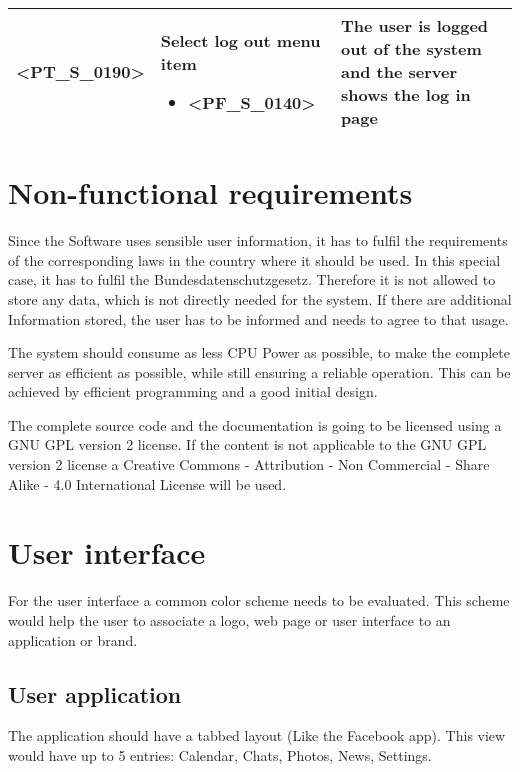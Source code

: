 \begin{longtable} {| p{} | p{} | p{} |}
    <PT\_S\_0190> & 
    Select log out menu item
        \begin{itemize} 
            \item <PF\_S\_0140>
        \end{itemize} & 
    The user is logged out of the system and the server shows the log in page \\ \hline
    
\end{longtable}

\chapter{Non-functional requirements}

Since the Software uses sensible user information, it has to fulfil the requirements of the corresponding laws in the country where it should be used. In this special case, it has to fulfil the Bundesdatenschutzgesetz. Therefore it is not allowed to store any data, which is not directly needed for the system. If there are additional Information stored, the user has to be informed and needs to agree to that usage.

The system should consume as less CPU Power as possible, to make the complete server as efficient as possible, while still ensuring a reliable operation. This can be achieved by efficient programming and a good initial design.

The complete source code and the documentation is going to be licensed using a GNU GPL version 2 license. If the content is not applicable to the GNU GPL version 2 license a Creative Commons - Attribution - Non Commercial - Share Alike - 4.0 International License will be used.

\chapter{User interface}

For the user interface a common color scheme needs to be evaluated. This scheme would help the user to associate a logo, web page or user interface to an application or brand.

\section{User application}
The application should have a tabbed layout (Like the Facebook app). This view would have up to 5 entries: Calendar, Chats, Photos, News, Settings.

